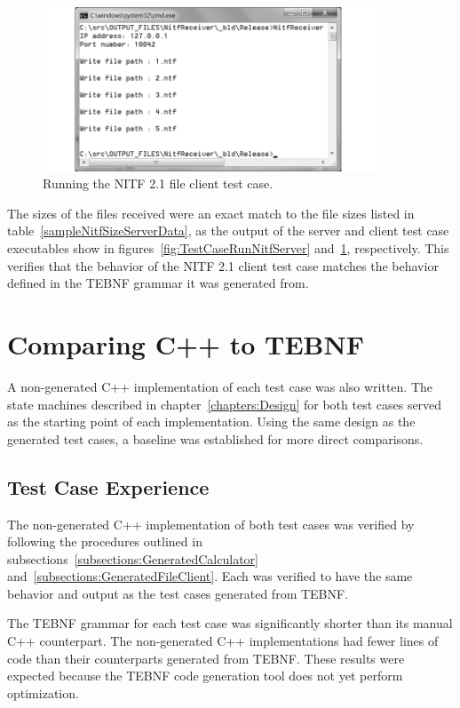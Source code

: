 \begin{figure}[h!]
\centering
\includegraphics[width=0.9\textwidth]{figures/TestCaseRunNitfReceiver.png}
\caption{Running the NITF 2.1 file client test case.}
\label{fig:TestCaseRunNitfReceiver}
\end{figure}

\indent
The sizes of the files received were an exact match to the file sizes listed in table~\ref{sampleNitfSizeServerData}, as the output of the server and client test case executables show in figures~\ref{fig:TestCaseRunNitfServer} and~\ref{fig:TestCaseRunNitfReceiver}, respectively.  This verifies that the behavior of the NITF 2.1 client test case matches the behavior defined in the TEBNF grammar it was generated from.

\section{Comparing C++ to TEBNF}
\label{sections:ComparingCplusplusToTEBNF}
A non-generated C++ implementation of each test case was also written.  The state machines described in chapter~\ref{chapters:Design} for both test cases served as the starting point of each implementation.  Using the same design as the generated test cases, a baseline was established for more direct comparisons.

\subsection{Test Case Experience}
The non-generated C++ implementation of both test cases was verified by following the procedures outlined in subsections~\ref{subsections:GeneratedCalculator} and~\ref{subsections:GeneratedFileClient}.  Each was verified to have the same behavior and output as the test cases generated from TEBNF.

\indent
The TEBNF grammar for each test case was significantly shorter than its manual C++ counterpart.  The non-generated C++ implementations had fewer lines of code than their counterparts generated from TEBNF.  These results were expected because the TEBNF code generation tool does not yet perform optimization.

